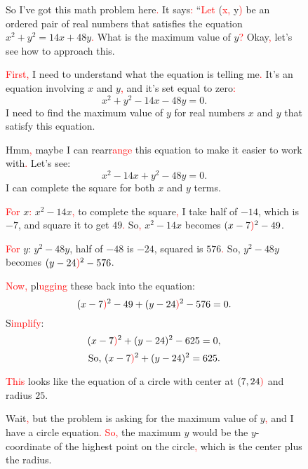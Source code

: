 \begin{figure*}[htbp]
    \centering
\begin{tcolorbox}[title=Example of \textcolor{red}{most shifted tokens} after fine-tuning on long CoT data. (1/2), promptstyle]
\lstset{
    basicstyle=\normalfont\sffamily\footnotesize,
    breaklines=true,
    frame=none,
    columns=fullflexible,
}
So I've got this math problem here\textcolor{red}{.} It says\textcolor{red}{:} ``\textcolor{red}{Let} (\textcolor{red}{x}\textcolor{red}{,} y\textcolor{red}{)} be an ordered pair of real numbers that satisfies the equation \(x^2 + y^2 = 14x + 48y\)\textcolor{red}{.} What is the maximum value of \(y\)\textcolor{red}{?} Okay\textcolor{red}{,} let's see how to approach this.

\textcolor{red}{First}\textcolor{red}{,} I need to understand what the equation is telling me\textcolor{red}{.} It's an equation involving \(x\) and \(y\)\textcolor{red}{,} and it's set equal to zero\textcolor{red}{:} 
\[
x^2 + y^2 - 14x - 48y = 0.
\]
I need to find the maximum value of \(y\) for real numbers \(x\) and \(y\) that satisfy this equation.

Hmm\textcolor{red}{,} maybe I can rearr\textcolor{red}{ange} this equation to make it easier to work with\textcolor{red}{.} Let's see:
\[
x^2 - 14x + y^2 - 48y = 0.
\]
I can complete the square for both \(x\) and \(y\) terms.

\textcolor{red}{For} \(x\)\textcolor{red}{:} \(x^2 - 14x\)\textcolor{red}{,} to complete the square\textcolor{red}{,} I take half of \(-14\), which is \(-7\), and square it to get \(49\)\textcolor{red}{.} So\textcolor{red}{,} \(x^2 - 14x\) becomes \((x - 7\textcolor{red}{)}^2 - 49\).

\textcolor{red}{For} \(y\): \(y^2 - 48y\), half of \(-48\) is \(-24\), squared is \(576\)\textcolor{red}{.} So, \(y^2 - 48y\) becomes \((y - 24\textcolor{red}{)}^2 - 576\).

\textcolor{red}{Now}\textcolor{red}{,} pl\textcolor{red}{ugging} these back into the equation:
\[
(x - 7\textcolor{red}{)}^2 - 49 + (y - 24\textcolor{red}{)}^2 - 576 = 0.
\]
S\textcolor{red}{implify}:
\[
(x - 7\textcolor{red}{)}^2 + (y - 24)^2 - 625 = 0,
\]
\[
\text{So, } (x - 7\textcolor{red}{)}^2 + (y - 24)^2 = 625.
\]

\textcolor{red}{This} looks like the equation of a circle with center at \((7, 24\textcolor{red}{)}\) and radius \(25\).

Wait\textcolor{red}{,} but the problem is asking for the maximum value of \(y\)\textcolor{red}{,} and I have a circle equation\textcolor{red}{.} \textcolor{red}{So}\textcolor{red}{,} the maximum \(y\) would be the \(y\)-coordinate of the highest point on the circle\textcolor{red}{,} which is the center plus the radius.


\end{tcolorbox}
\end{figure*}
